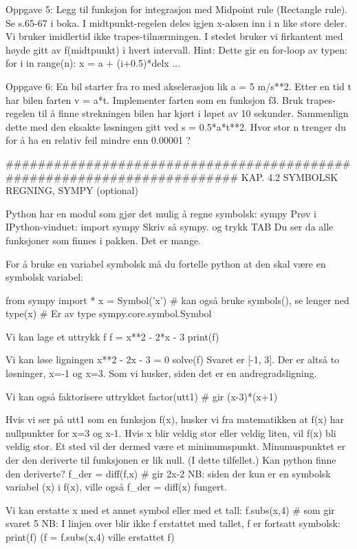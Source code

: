 \documentclass[a4paper,11pt,utf8]{book}
\begin{document}
Oppgave 5: Legg til funksjon for integrasjon med Midpoint rule (Rectangle rule). 
Se s.65-67 i boka.
I midtpunkt-regelen deles igjen x-aksen inn i n like store deler. 
Vi bruker imidlertid ikke trapes-tilnærmingen.
I stedet bruker vi firkantent med høyde gitt av f(midtpunkt) i hvert intervall.
Hint: Dette gir en for-loop av typen:
    for i in range(n):
        x = a + (i+0.5)*delx
        ... 


Oppgave 6: En bil starter fra ro med akselerasjon lik a = 5 m/s**2.
Etter en tid t har bilen farten v = a*t.
Implementer farten som en funksjon f3. 
Bruk trapes-regelen til å finne strekningen bilen har kjørt i løpet av 10 sekunder. 
Sammenlign dette med den eksakte løsningen gitt ved s = 0.5*a*t**2.
Hvor stor n trenger du for å ha en relativ feil mindre enn 0.00001 ? 



######################################################################## 
KAP. 4.2  SYMBOLSK REGNING, SYMPY  (optional)

Python har en modul som gjør det mulig å regne symbolsk: sympy
Prøv i IPython-vinduet:
import sympy
Skriv så sympy. og trykk TAB
Du ser da alle funksjoner som finnes i pakken. Det er mange.

For å bruke en variabel symbolsk må du fortelle python at den skal være en symbolsk variabel:

from sympy import *
x = Symbol('x')   # kan også bruke symbols(), se lenger ned 
type(x)           # Er av type sympy.core.symbol.Symbol

Vi kan lage et uttrykk f
f = x**2 - 2*x - 3 
print(f)

Vi kan løse ligningen x**2 - 2x - 3 = 0
solve(f)
Svaret er [-1, 3]. Der er altså to løsninger, x=-1 og x=3.
Som vi husker, siden det er en andregradsligning.

Vi kan også faktorisere uttrykket
factor(utt1)    # gir (x-3)*(x+1)

Hvis vi ser på utt1 som en funksjon f(x), husker vi fra matematikken at f(x) har nullpunkter for x=3 og x-1. 
Hvis x blir veldig stor eller veldig liten, vil f(x) bli veldig stor. 
Et sted vil der dermed være et minimumspunkt.
Minumuspunktet er der den deriverte til funksjonen er lik null. (I dette tilfellet.) 
Kan python finne den deriverte? 
f_der = diff(f,x)    # gir 2x-2
NB: siden der kun er en symbolsk variabel (x) i f(x), ville også f_der = diff(x) fungert. 

Vi kan erstatte x med et annet symbol eller med et tall:
f.subs(x,4)    # som gir svaret 5
NB: I linjen over blir ikke f erstattet med tallet, f er fortsatt symbolsk: 
print(f)
(f = f.subs(x,4) ville erstattet f)
\end{document}
